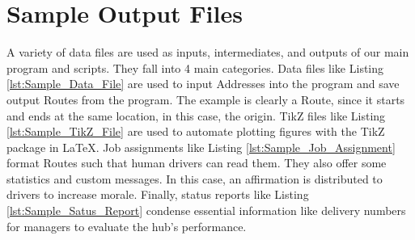 \documentclass[letterpaper]{article}
\begin{document}
    \appendix
    \section{Sample Output Files}
    \label{appendix:Sample_Output_Files}

    A variety of data files are used as inputs, intermediates, and outputs of our main program and scripts. They fall into 4 main categories. Data files like Listing \ref{lst:Sample_Data_File} are used to input Addresses into the program and save output Routes from the program. The example is clearly a Route, since it starts and ends at the same location, in this case, the origin. TikZ files like Listing \ref{lst:Sample_TikZ_File} are used to automate plotting figures with the TikZ package in \LaTeX . Job assignments like Listing \ref{lst:Sample_Job_Assignment} format Routes such that human drivers can read them. They also offer some statistics and custom messages. In this case, an affirmation is distributed to drivers to increase morale. Finally, status reports like Listing \ref{lst:Sample_Satus_Report} condense essential information like delivery numbers for managers to evaluate the hub's performance.

    

    

    

    

    
    
\end{document}
